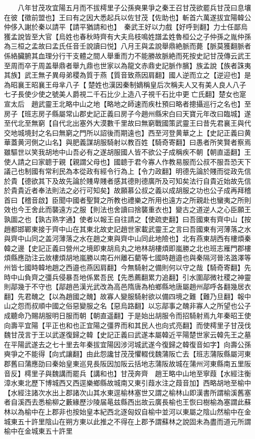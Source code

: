 　　八年甘茂攻宜陽五月而不拔樗里子公孫奭果爭之秦王召甘茂欲罷兵甘茂曰息壤在彼【徵前盟也】王曰有之因大悉起兵以佐甘茂【佐助也】斬首六萬遂拔宜陽韓公仲侈入謝於秦以請平【請平猶請和也】　秦武王好以力戲【好呼到翻】力士任鄙烏獲孟說皆至大官【烏姓也春秋時齊有大夫烏枝鳴姓譜孟姓魯桓公之子仲孫之胤仲孫為三桓之孟故曰孟氏任音壬說讀曰悦】八月王與孟說舉鼎絶脈而薨【脈莫獲翻脈者係絡臟腑其血理分行干支體之間人舉重而力不能勝故脈絶而死按史記甘茂傳云武王至周而卒于周盖舉鼎者舉九鼎也世家以為龍文赤鼎史記脈作臏】族孟說【族者誅夷其族】武王無子異母弟稷為質于燕【質音致燕因肩翻】國人逆而立之【逆迎也】是為昭襄王昭襄王母芈八子【楚姓也漢因秦制嫡稱皇后次稱夫人又有美人良人八子七子長使少使之號美人爵視二千石比少上造八子視千石比中更亡氏翻】楚女也寔宣太后　趙武靈王北略中山之地【略地之師速而疾杜預曰略者摠攝巡行之名也】至房子【班志房子縣屬常山郡史記正義曰房子今趙州縣宋白曰天寶元年改曰臨城】遂至代北至無窮【自代北出塞外大漠數千里故曰無窮戰國策武靈王曰昔先君襄王與代交地城境封之名曰無窮之門所以詔後而期遠也】西至河登黄華之上【史記正義曰黄華蓋黄河側之山名】與肥義謀胡服騎射以教百姓【騎奇寄翻】曰愚者所笑賢者察焉雖驅世以笑我胡地中山吾必有之遂胡服國人皆不欲公子成稱疾不朝【朝直遥翻】王使人請之曰家聼于親【親謂父母也】國聼于君今寡人作教易服而公叔不服吾恐天下議己也制國有常利民為本從政有經令行為上【令力政翻】明德先論於賤而從政先信於貴【德欲其下及故先論於賤卑賤者感其德則德廣所及可知矣法行自貴近始故先信於貴貴近者奉法則法之必行可知矣】故願慕公叔之義以成胡服之功也公子成再拜稽首曰【稽音啟】臣聞中國者聖賢之所教也禮樂之所用也遠方之所親赴也蠻夷之所則效也今王舍此而襲遠方之服【則法也舍讀曰捨襲重衣也】變古之道逆人之心臣願王孰圖之也【孰古熟字通】使者以報王自往請之【使疏吏翻】曰吾國東有齊中山【按趙都邯鄲東接于齊中山在其東北故史記趙世家載武靈王之言曰吾國東有河薄落之水與齊中山同之盖河薄落之水在趙之東與齊中山同此地險也】北有燕東胡西有樓煩秦韓之邊【史記正義曰營州之境即東胡烏丸之地林胡樓煩即嵐勝之北也班志雁門郡樓煩縣應劭注云故樓煩胡地嵐勝以南石州離石藺等七國時趙邉也與秦隔河晉洺潞澤等州皆七國時韓地趙之西邉也燕因肩翻】今無騎射之備則何以守之哉【騎奇寄翻】先時中山負齊之彊兵侵暴吾地係累吾民【先悉薦翻累力追翻】引水圍鄗微社稷之神靈則鄗幾于不守也【鄗趙邑漢光武改為高邑隋唐為柏鄉縣地唐屬趙州鄗呼各翻幾居衣翻】先君醜之【以為趙國之醜】故寡人變服騎射欲以備四境之難【難乃旦翻】報中山之怨而叔順中國之俗惡變服之名【惡烏路翻】以忘鄗事之醜非寡人之所望也公子成聽命乃賜胡服明日服而朝【朝直遥翻】于是始出胡服令而招騎射焉九年秦昭王使向壽平宜陽【平正也和也正宜陽之彊界而和其民人也向式亮翻】而使樗里子甘茂伐魏甘茂言于王以武遂復歸之韓【史記正義曰武遂本屬韓近平陽楚世家云韓先王之墓在平陽武遂去之七十里去年秦拔宜陽因涉河城武遂今復歸之韓復音如字】向壽公孫奭爭之不能得【向式讓翻】由此怨讒甘茂茂懼輟伐魏蒲阪亡去【班志蒲阪縣屬河東郡舊曰蒲應劭曰秦始皇東巡見長阪因加阪云括地志蒲阪故城在蒲州河東縣南五里阪音反】樗里子與魏講而罷兵【講和也】甘茂奔齊　趙王略中山地至寧葭【水經注衡漳水東北歷下博城西又西逕樂鄉縣故城南又東引葭水注之葭音加】西略胡地至榆中【水經注諸次水出上郡諸次山其水東逕榆林塞世又謂之榆林山即漢書所謂榆溪舊塞者自溪西去悉榆柳之藪緣歷沙陵届㫣兹縣西出故云廣長榆也王恢曰樹榆為塞謂此蘇林以為榆中在上郡非也按始皇本紀西北逐匈奴自榆中並河以東屬之陰山然榆中在金城東五十許里陰山在朔方東以此推之不得在上郡予謂蘇林之說固未為盡而道元所謂榆中在金城東五十許里